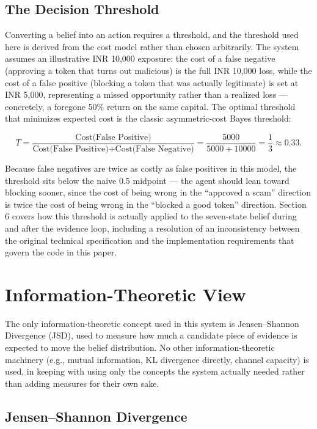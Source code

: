 \documentclass[11pt]{article}
\begin{document}
\subsection{The Decision Threshold}

Converting a belief into an action requires a threshold, and the threshold used here is derived from the cost model rather than chosen arbitrarily. The system assumes an illustrative INR 10,000 exposure: the cost of a false negative (approving a token that turns out malicious) is the full INR 10,000 loss, while the cost of a false positive (blocking a token that was actually legitimate) is set at INR 5,000, representing a missed opportunity rather than a realized loss --- concretely, a foregone 50\% return on the same capital. The optimal threshold that minimizes expected cost is the classic asymmetric-cost Bayes threshold:

\[
T = \frac{\text{Cost(False Positive)}}{\text{Cost(False Positive)}+\text{Cost(False Negative)}}
= \frac{5000}{5000+10000}
= \frac{1}{3}
\approx 0.33.
\]

Because false negatives are twice as costly as false positives in this model, the threshold sits below the naive 0.5 midpoint --- the agent should lean toward blocking sooner, since the cost of being wrong in the ``approved a scam'' direction is twice the cost of being wrong in the ``blocked a good token'' direction. Section 6 covers how this threshold is actually applied to the seven-state belief during and after the evidence loop, including a resolution of an inconsistency between the original technical specification and the implementation requirements that govern the code in this paper.

\section{Information-Theoretic View}

The only information-theoretic concept used in this system is Jensen--Shannon Divergence (JSD), used to measure how much a candidate piece of evidence is expected to move the belief distribution. No other information-theoretic machinery (e.g., mutual information, KL divergence directly, channel capacity) is used, in keeping with using only the concepts the system actually needed rather than adding measures for their own sake.

\subsection{Jensen--Shannon Divergence}
\end{document}
